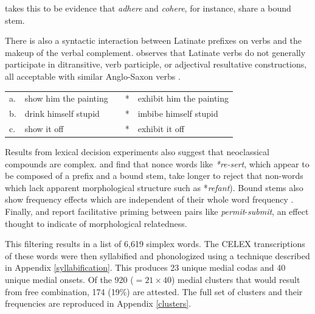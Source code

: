 \noindent
\citeauthor{Aronoff1976} takes this to be evidence that \emph{adhere} and \emph{cohere}, for instance, share a bound stem.

There is also a syntactic interaction between Latinate prefixes on verbs and the makeup of the verbal complement. \citet{Harley2009} observes that Latinate verbs do not generally participate in ditransitive, verb participle, or adjectival resultative constructions, all acceptable with similar Anglo-Saxon verbs \citep[see also][]{Gropen1989,Coppock2008}. 

\begin{example} 
\label{harley}
\begin{tabular}{l l l l@{} l}
a. & {show him the painting} & \alt{} & * & {exhibit him the painting} \\
b. & {drink himself stupid}  & \alt{} & * & {imbibe himself stupid}    \\
c. & {show it off}           & \alt{} & * & {exhibit it off}           \\
\end{tabular}
\end{example}

Results from lexical decision experiments also suggest that neoclassical compounds are complex. \citet{Taft1975,Taft1976} and \citet{Taft1986} find that nonce words like \emph{*re-sert}, which appear to be composed of a prefix and a bound stem, take longer to reject that non-words which lack apparent morphological structure such as *\emph{refant}). Bound stems also show frequency effects which are independent of their whole word frequency \citep{Taft1979,Taft2006}. Finally, \citet{Emmorey1989} and \citet{Forster2000} report facilitative priming between pairs like \emph{permit}-\emph{submit}, an effect thought to indicate of morphological relatedness.

This filtering results in a list of 6,619 simplex words. The CELEX transcriptions of these words were then syllabified and phonologized using a technique described in Appendix \ref{syllabification}. This produces 23 unique medial codas and 40 unique medial onsets. Of the 920 ($= 21 \times 40$) medial clusters that would result from free combination, 174 (19\%) are attested. The full set of clusters and their frequencies are reproduced in Appendix \ref{clusters}. 

